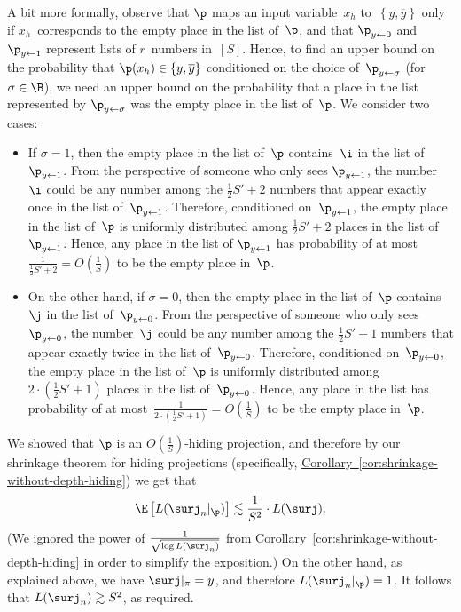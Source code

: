 \documentclass[11pt]{article}
\numberwithin{equation}{section}
\theoremstyle{definition}
\theoremstyle{plain}
\newcommand{\expref}[2]{\hyperref[#2]{#1~\ref{#2}}}
\theoremstyle{definition}\newtheorem{notation}[theorem]{Notation}\theoremstyle{plain}
\begin{document}
A bit more formally, observe that $\p$ maps an input variable~$x_{h}$
to~$\left\{ y,\overline{y}\right\} $ only if $x_{h}$~corresponds
to the empty place in the list of~$\p$, and that $\p_{y\gets0}$
and $\p_{y\gets1}$ represent lists of $r$~numbers in~$\left[S\right]$.
Hence, to %
find an upper bound on  %
the probability that 
$\p(x_{h})\in\left\{ y,\overline{y}\right\} $
conditioned on the choice of~$\p_{y\gets\sigma}$ (for $\sigma\in\B$),
we %
need an upper bound on  %
the probability that a place in the list represented
by $\p_{y\gets\sigma}$ was the empty place in the list of~$\p$.
We consider two cases:
\begin{itemize}
\item If $\sigma=1$, then the empty place in the list of~$\p$ contains~$\i$
in the list of~$\p_{y\gets1}$. From the perspective of someone who
only sees $\p_{y\gets1}$, the number~$\i$ could be any number among
the $\frac{1}{2}S'+2$ numbers that appear exactly once in the list
of~$\p_{y\gets1}$. Therefore, conditioned on~$\p_{y\gets1}$, the
empty place in the list of~$\p$ is uniformly distributed among $\frac{1}{2}S'+2$
places in the list of~$\p_{y\gets1}$. Hence, any place in the list
of $\p_{y\gets1}$ has probability of at most~$\frac{1}{\frac{1}{2}S'+2}=O\left(\frac{1}{S}\right)$
to be the empty place in~$\p$.
\item On the other hand, if $\sigma=0$, %
%
%
%
then the empty place in the list
of~$\p$ contains~$\j$ in the list of~$\p_{y\gets0}$. From the
perspective of someone who only sees~$\p_{y\gets0}$, the number~$\j$
could be any number among the $\frac{1}{2}S'+1$ numbers that appear
exactly twice in the list of~$\p_{y\gets0}$. Therefore, conditioned
on~$\p_{y\gets0}$, the empty place in the list of~$\p$ is uniformly
distributed among $2\cdot\left(\frac{1}{2}S'+1\right)$ places in
the list of~$\p_{y\gets0}$. Hence, any place in the list has probability
of at most~$\frac{1}{2\cdot\left(\frac{1}{2}S'+1\right)}=O\left(\frac{1}{S}\right)$
to be the empty place in~$\p$.
\end{itemize}
We showed that $\p$ is an $O(\frac{1}{S})$-hiding projection, and
therefore by our shrinkage theorem for hiding projections (specifically,
\expref{Corollary}{cor:shrinkage-without-depth-hiding}) we get that
\[
\E\left[L(\surj_{n}|_{\p})\right]\lesssim\frac{1}{S^{2}}\cdot L(\surj).
\]
(We ignored the power of $\frac{1}{\sqrt{\log L(\surj_{n})}}$ from
\expref{Corollary}{cor:shrinkage-without-depth-hiding} in order to simplify the exposition.)
On the other hand, as explained above, we have $\surj|_{\pi}=y$,
and therefore $L(\surj_{n}|_{\p})=1$. It follows that $L(\surj_{n})\gtrsim S^{2}$, as
required.
\end{document}
